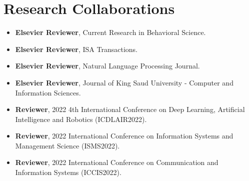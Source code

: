 \section{\textbf{Research Collaborations}}
\begin{itemize}[leftmargin=*,itemsep=2pt,parsep=0pt]
    \item \textbf{Elsevier Reviewer}, Current Research in Behavioral Science.
    \item \textbf{Elsevier Reviewer}, ISA Transactions.
    \item \textbf{Elsevier Reviewer}, Natural Language Processing Journal.
    \item \textbf{Elsevier Reviewer}, Journal of King Saud University - Computer
    and Information Sciences.
    \item \textbf{Reviewer}, 2022 4th International Conference on Deep Learning,
    Artificial Intelligence and Robotics (ICDLAIR2022).
    \item \textbf{Reviewer}, 2022 International Conference on Information Systems
    and Management Science (ISMS2022).
    \item \textbf{Reviewer}, 2022 International Conference on Communication and Information
    Systems (ICCIS2022).
\end{itemize}
